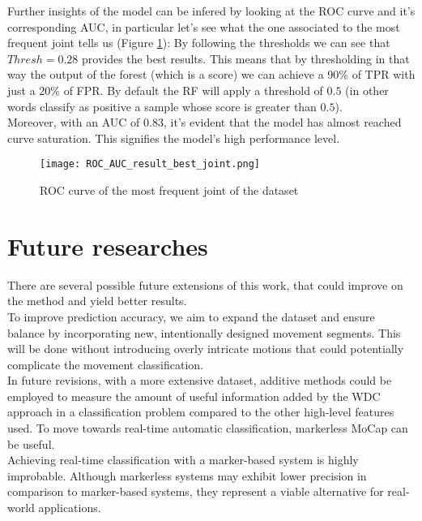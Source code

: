 Further insights of the model can be infered by looking at the ROC curve and it's corresponding AUC, in particular let's see what the one associated to the most frequent joint tells us (Figure \ref{fig:roc_auc_results}):
By following the thresholds we can see that $Thresh = 0.28$ provides the best results. This means that by thresholding in that way the output of the forest (which is a score) we can achieve a 90\% of TPR with just a 20\% of FPR.
By default the RF will apply a threshold of $0.5$ (in other words classify as positive a sample whose score is greater than $0.5$).\\

Moreover, with an AUC of $0.83$, it's evident that the model has almost reached curve saturation. This signifies the model's high performance level.

\begin{figure}
  \centering
  \texttt{[image: ROC\_AUC\_result\_best\_joint.png]}
  \caption{ROC curve of the most frequent joint of the dataset}
  \label{fig:roc_auc_results}
\end{figure}

\clearpage


\section{Future researches}
\label{sec:future_researches}
There are several possible future extensions of this work, that could improve on the method and yield better results. \\

To improve prediction accuracy, we aim to expand the dataset and ensure balance by incorporating new, intentionally designed movement segments.
This will be done without introducing overly intricate motions that could potentially complicate the movement classification.\\

In future revisions, with a more extensive dataset, additive methods could be employed to measure the amount of useful information added by the WDC approach in a classification problem compared to the other high-level features used.
To move towards real-time automatic classification, markerless MoCap can be useful.\\

Achieving real-time classification with a marker-based system is highly improbable.
Although markerless systems may exhibit lower precision in comparison to marker-based systems, 
they represent a viable alternative for real-world applications.\\

